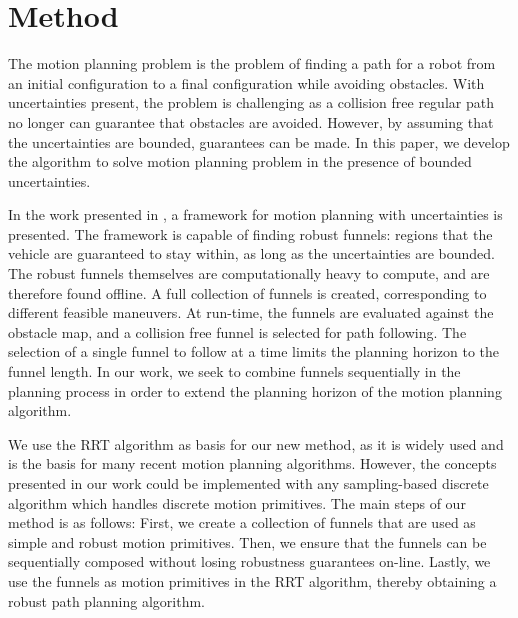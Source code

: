

\section{Method}

The motion planning problem is the problem of finding a path for a robot from an
initial configuration to a final configuration while avoiding obstacles. With
uncertainties present, the problem is challenging as a collision free regular
path no longer can guarantee that obstacles are avoided. However, by assuming
that the uncertainties are bounded, guarantees can be made. In this paper, we
develop the \rrtfunnel algorithm to solve motion planning problem in the
presence of bounded uncertainties.

In the work presented in \cite{majumdarFunnelLibrariesRealtime2017}, a framework
for motion planning with uncertainties is presented. The framework is capable of
finding robust funnels: regions that the vehicle are guaranteed to stay within,
as long as the uncertainties are bounded. The robust funnels themselves are
computationally heavy to compute, and are therefore found offline. A full
collection of funnels is created, corresponding to different feasible maneuvers.
At run-time, the funnels are evaluated against the obstacle map, and a collision
free funnel is selected for path following. The selection of a single funnel to
follow at a time limits the planning horizon to the funnel length. In our work,
we seek to combine funnels sequentially in the planning process in order to
extend the planning horizon of the motion planning algorithm.


We use the RRT algorithm as basis for our new method, as it is widely used and
is the basis for many recent motion planning algorithms. However, the concepts
presented in our work could be implemented with any sampling-based discrete
algorithm which handles discrete motion primitives. The main steps of our method
is as follows: First, we create a collection of funnels that are used as simple
and robust motion primitives. Then, we ensure that the funnels can be
sequentially composed without losing robustness guarantees on-line. Lastly, we
use the funnels as motion primitives in the RRT algorithm, thereby obtaining a
robust path planning algorithm.


